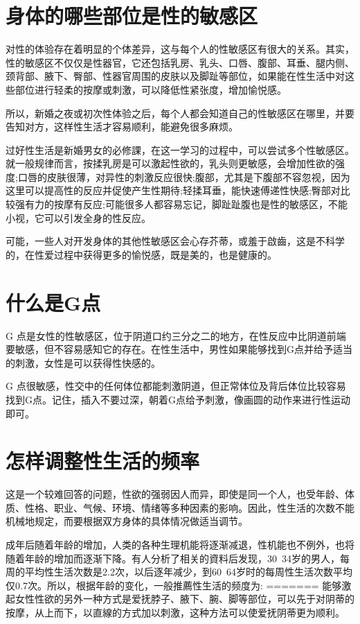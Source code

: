 \documentclass[12pt,UTF8]{ctexbook}
\begin{document}
\section{身体的哪些部位是性的敏感区}

对性的体验存在着明显的个体差异，这与每个人的性敏感区有很大的关系。其实，性的敏感区不仅仅是性器官，它还包括乳房、乳头、口唇、腹部、耳垂、腿内侧、颈背部、腋下、臀部、性器官周围的皮肤以及脚趾等部位，如果能在性生活中对这些部位进行轻柔的按摩或刺激，可以降低性紧张度，增加愉悦感。

所以，新婚之夜或初次性体验之后，每个人都会知道自己的性敏感区在哪里，并要告知对方，这样性生活才容易顺利，能避免很多麻烦。

过好性生活是新婚男女的必修課，在这一学习的过程中，可以尝试多个性敏感区。就一般规律而言，按揉乳房是可以激起性欲的，乳头则更敏感，会增加性欲的强度;口唇的皮肤很薄，对异性的刺激反应很快;腹部，尤其是下腹部不容忽视，因为这里可以提高性的反应并促使产生性期待;轻揉耳垂，能快速傅递性快感;臀部对比较强有力的按摩有反应;可能很多人都容易忘记，脚趾趾腹也是性的敏感区，不能小视，它可以引发全身的性反应。

可能，一些人对开发身体的其他性敏感区会心存芥蒂，或羞于啟齒，这是不科学的，在性爱过程中获得更多的愉悦感，既是美的，也是健康的。

\section{什么是G点}

G 点是女性的性敏感区，位于阴道口约三分之二的地方，在性反应中比阴道前端要敏感，但不容易感知它的存在。在性生活中，男性如果能够找到G点并给予适当的刺激，女性是可以获得性快感的。

G 点很敏感，性交中的任何体位都能刺激阴道，但正常体位及背后体位比较容易找到G点。记住，插入不要过深，朝着G点给予刺激，像画圆的动作来进行性运动即可。

\section{怎样调整性生活的频率}

这是一个较难回答的问题，性欲的强弱因人而异，即使是同一个人，也受年龄、体质、性格、职业、气候、环境、情绪等多种因素的影响。因此，性生活的次数不能机械地规定，而要根据双方身体的具体情况做适当调节。

成年后随着年龄的增加，人类的各种生理机能将逐渐减退，性机能也不例外，也将随着年龄的增加而逐渐下降。有人分析了相关的資料后发现，30~34岁的男人，每周的平均性生活次数是2.2次，以后逐年减少，到60~64岁时的每周性生活次数平均仅0.7次。所以，根据年龄的变化，一般推薦性生活的频度为:
=======
能够激起女性性欲的另外一种方式是爱抚脖子、腋下、腕、脚等部位，可以先于对阴蒂的按摩，从上而下，以直線的方式加以刺激，这种方法可以使爱抚阴蒂更为顺利。
\end{document}
